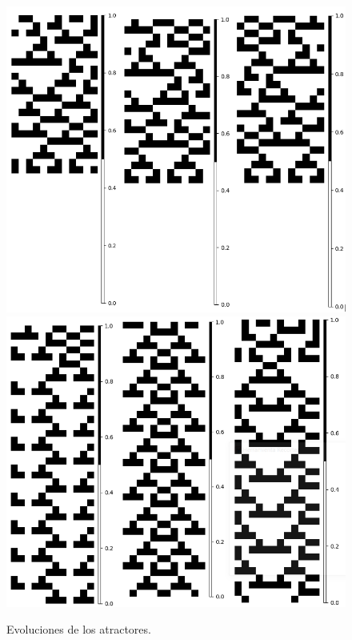 \documentclass[11pt]{article}
\begin{document}
			\begin{figure}[H]
			\centering
			\includegraphics[scale=0.3]{resources/Atractores22/atractor_22_size_12_res.png}
			\includegraphics[scale=0.3]{resources/Atractores22/atractor_22_size_12_res1.png}
			\caption{Evoluciones de los atractores.}\label{fig:picture}
			\end{figure}
\end{document}
